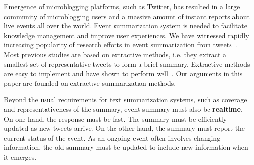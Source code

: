 \documentclass[runningheads]{llncs}
\begin{document}
Emergence of microblogging platforms, such as Twitter, has resulted in a large community of microblogging users and a massive amount of instant reports about live events all over the world.  Event summarization system is needed to facilitate knowledge management and improve user experiences. We have witnessed rapidly increasing popularity of research efforts in event summarization from tweets~\cite{Takamura2011Summarizing,Lin2012Generating,Rudra2015Extracting,Shou2013Sumblr,Liu2016LEDS,Gillani2017Post,Zubiaga2012Towards,Sharifi2010Summarizing}.   Most previous studies are based on extractive methods, i.e. they extract a smallest set of representative tweets to form a brief summary. Extractive methods are easy to implement and have shown to perform well~\cite{Takamura2011Summarizing,Lin2012Generating,Rudra2015Extracting,Shou2013Sumblr,Liu2016LEDS,Gillani2017Post,Zubiaga2012Towards}. Our arguments in this paper are founded on extractive summarization methods.

Beyond the usual requirements for text summarization systems, such as coverage and representativeness of the summary,  event summary must also be \textbf{realtime}. On one hand, the response must be fast. The summary must be efficiently updated as new tweets arrive. On the other hand, the summary must report the current status of the event. As an ongoing event often involves changing information, the old summary must be updated to include new information when it emerges.
\end{document}
